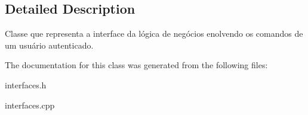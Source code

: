 \subsection{Detailed Description}
Classe que representa a interface da lógica de negócios enolvendo os comandos de um usuário autenticado. 

The documentation for this class was generated from the following files\+:\begin{DoxyCompactItemize}
\item 
interfaces.\+h\item 
interfaces.\+cpp\end{DoxyCompactItemize}
